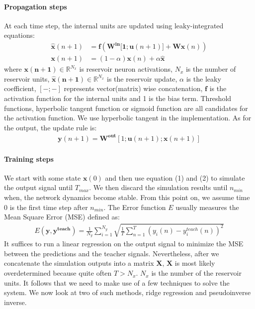 \documentclass[a4paper,11pt,oneside]{article}
\begin{document}
\paragraph{Propagation steps} At each time step, the internal units are updated using leaky-integrated equations:
\begin{align}
\mathbf{\hat{x}} (n + 1) &= \mathbf{f}(\mathbf{W^{in}[1; u}(n+1)] + \mathbf{Wx}(n)) \\
\mathbf{x}(n + 1) &= (1 - \alpha)\mathbf{x}(n) + \alpha \mathbf{\hat{x}}
\end{align}
where $\mathbf{x(n + 1)} \in \mathbb{R}^{N_x}$ is reservoir neuron activations, $N_x$ is the number of reservoir units, $\mathbf{\hat{x}(n + 1)} \in \mathbb{R}^{N_x}$ is the reservoir update,  $\alpha$ is the leaky coefficient, $[-;-]$ represents vector(matrix) wise concatenation, $\mathbf{f}$ is the activation function for the internal units and 1 is the bias term. Threshold functions, hyperbolic tangent function or sigmoid function are all candidates for the activation function. We use hyperbolic tangent in the implementation.  As for the output, the update rule is:
\begin{align}
\mathbf{y} (n + 1) = \mathbf{W^{out}}[1; \mathbf{u}(n+1);\mathbf{x}(n+1)]
\end{align}


\paragraph{Training steps} We start with some state $\mathbf{x}(0)$ and then use equation (1) and (2) to simulate the output signal until $T_{max}$. We then discard the simulation results until $n_{min}$ when, the network dynamics become stable. From this point on, we assume time 0 is the first time step after $n_{min}$. The Error function $E$ usually measures the Mean Square Error (MSE)  defined as:
\begin{align}
E(\mathbf{y, y^{teach}}) = \frac{1}{N_y} \sum^{N_y}_{i=1} \sqrt{\frac{1}{T} \sum^{T}_{n=1}(y_i(n) - y_i^{teach}(n) )^2}
\end{align} 
It suffices to run a linear regression on the output signal to minimize the MSE between the predictions and the teacher signals. Nevertheless, after we concatenate the simulation outputs into a matrix $\mathbf{X}$, $\mathbf{X}$ is most likely overdetermined because quite often $ T > N_x $. $N_x$ is the number of the reservoir units. It follows that we need to make use of a few techniques to solve the system. We now look at two of such methods, ridge regression and pseudoinverse inverse.
\end{document}
